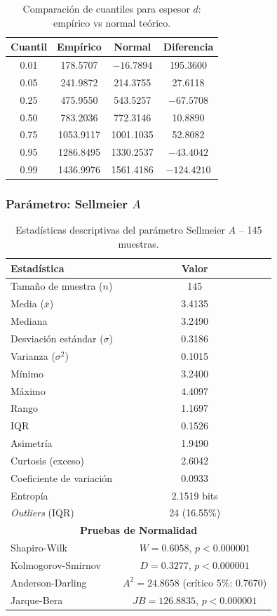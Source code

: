 \documentclass{article}
\begin{document}
\begin{table}[htbp]
\centering
\caption{Comparaci\'on de cuantiles para espesor $d$: emp\'irico vs normal te\'orico.}
\label{tab:quant-d}
\begin{tabular}{@{}cccc@{}}
\toprule
\textbf{Cuantil} & \textbf{Emp\'irico} & \textbf{Normal} & \textbf{Diferencia} \\
\midrule
0.01 & 178.5707 & $-16.7894$ & 195.3600 \\
0.05 & 241.9872 & 214.3755 & 27.6118 \\
0.25 & 475.9550 & 543.5257 & $-67.5708$ \\
0.50 & 783.2036 & 772.3146 & 10.8890 \\
0.75 & 1053.9117 & 1001.1035 & 52.8082 \\
0.95 & 1286.8495 & 1330.2537 & $-43.4042$ \\
0.99 & 1436.9976 & 1561.4186 & $-124.4210$ \\
\bottomrule
\end{tabular}
\end{table}

\subsubsection{Par\'ametro: Sellmeier $A$}

\begin{table}[htbp]
\centering
\caption{Estad\'isticas descriptivas del par\'ametro Sellmeier $A$ -- 145 muestras.}
\label{tab:stats-A}
\begin{tabular}{@{}lc@{}}
\toprule
\textbf{Estad\'istica} & \textbf{Valor} \\
\midrule
Tama\~no de muestra ($n$) & 145 \\
Media ($\bar{x}$) & 3.4135 \\
Mediana & 3.2490 \\
Desviaci\'on est\'andar ($\sigma$) & 0.3186 \\
Varianza ($\sigma^2$) & 0.1015 \\
M\'inimo & 3.2400 \\
M\'aximo & 4.4097 \\
Rango & 1.1697 \\
IQR & 0.1526 \\
\midrule
Asimetr\'ia & 1.9490 \\
Curtosis (exceso) & 2.6042 \\
Coeficiente de variaci\'on & 0.0933 \\
Entrop\'ia & 2.1519 bits \\
\midrule
\textit{Outliers} (IQR) & 24 (16.55\%) \\
\midrule
\multicolumn{2}{c}{\textbf{Pruebas de Normalidad}} \\
\midrule
Shapiro-Wilk & $W = 0.6058$, $p < 0.000001$ \\
Kolmogorov-Smirnov & $D = 0.3277$, $p < 0.000001$ \\
Anderson-Darling & $A^2 = 24.8658$ (cr\'itico 5\%: 0.7670) \\
Jarque-Bera & $JB = 126.8835$, $p < 0.000001$ \\
\bottomrule
\end{tabular}
\end{table}
\end{document}
